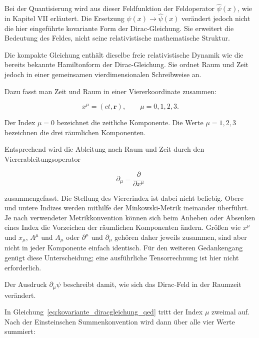 Bei der Quantisierung wird aus dieser Feldfunktion der Feldoperator
\(\hat{\psi}(x)\), wie in Kapitel VII erläutert.
Die Ersetzung \(\psi(x)\longrightarrow\hat{\psi}(x)\) verändert jedoch
nicht die hier eingeführte kovariante Form der Dirac-Gleichung.
Sie erweitert die Bedeutung des Feldes, nicht seine relativistische
mathematische Struktur.

Die kompakte Gleichung enthält dieselbe freie relativistische Dynamik wie
die bereits bekannte Hamiltonform der Dirac-Gleichung.
Sie ordnet Raum und Zeit jedoch in einer gemeinsamen
vierdimensionalen Schreibweise an.

Dazu fasst man Zeit und Raum in einer
Viererkoordinate zusammen:

\begin{equation}
	x^\mu
	=
	\left(ct,\mathbf r\right),
	\qquad
	\mu=0,1,2,3.
	\label{eq:viererkoordinate_qed}
\end{equation}

Der Index \(\mu=0\) bezeichnet die zeitliche Komponente.
Die Werte \(\mu=1,2,3\) bezeichnen die drei räumlichen Komponenten.

Entsprechend wird die Ableitung nach Raum und Zeit durch den
Viererableitungsoperator

\begin{equation}
	\partial_\mu
	=
	\frac{\partial}{\partial x^\mu}
	\label{eq:viererableitung_qed}
\end{equation}

zusammengefasst.
Die Stellung des Viererindex ist dabei nicht beliebig.
Obere und untere Indizes werden mithilfe der
Minkowski-Metrik ineinander überführt.
Je nach verwendeter Metrikkonvention können sich beim Anheben oder
Absenken eines Index die Vorzeichen der räumlichen Komponenten ändern.
Größen wie \(x^\mu\) und \(x_\mu\), \(A^\mu\) und \(A_\mu\) oder
\(\partial^\mu\) und \(\partial_\mu\) gehören daher jeweils zusammen,
sind aber nicht in jeder Komponente einfach identisch.
Für den weiteren Gedankengang genügt diese Unterscheidung; eine
ausführliche Tensorrechnung ist hier nicht erforderlich.

Der Ausdruck \(\partial_\mu\psi\) beschreibt damit, wie sich das
Dirac-Feld in der Raumzeit verändert.

In Gleichung~\eqref{eq:kovariante_diracgleichung_qed} tritt der Index
\(\mu\) zweimal auf.
Nach der Einsteinschen
Summenkonvention wird dann über
alle vier Werte
summiert:

